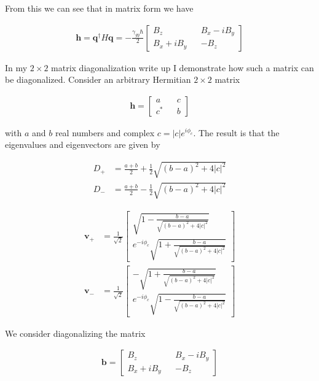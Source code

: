 \documentclass[12pt]{article}
\newcommand{\bv}[1]{\boldsymbol{#1}}
\begin{document}
From this we can see that in matrix form we have

\begin{align}
\bv{h} = \bv{q}^{\dag}H\bv{q} = -\frac{\gamma_{gy}\hbar}{2}\begin{bmatrix}
B_z && B_x-iB_y\\
B_x+iB_y && -B_z
\end{bmatrix}
\end{align}

In my $2\times2$ matrix diagonalization write up I demonstrate how such a matrix can be diagonalized.
Consider an arbitrary Hermitian $2\times 2$ matrix

\begin{align}
\bv{h} = \begin{bmatrix}
a && c\\
c^* && b
\end{bmatrix}
\end{align}

with $a$ and $b$ real numbers and complex $c = |c|e^{i\phi_c}$.
The result is that the eigenvalues and eigenvectors are given by

\begin{align}
D_+ &= \frac{a+b}{2} + \frac{1}{2}\sqrt{(b-a)^2 + 4|c|^2} \nonumber\\
D_- &= \frac{a+b}{2} - \frac{1}{2}\sqrt{(b-a)^2 + 4|c|^2}
\end{align}

\begin{align}
\bv{v}_+ &= 
\frac{1}{\sqrt{2}}\begin{bmatrix}
\sqrt{1-\frac{b-a}{\sqrt{(b-a)^2+4|c|^2}}}\\e^{-i\phi_c}\sqrt{1+\frac{b-a}{\sqrt{(b-a)^2+4|c|^2}}}
\end{bmatrix} \nonumber\\
\bv{v}_- &= 
\frac{1}{\sqrt{2}}\begin{bmatrix}
-\sqrt{1+\frac{b-a}{\sqrt{(b-a)^2+4|c|^2}}}\\e^{-i\phi_c}\sqrt{1-\frac{b-a}{\sqrt{(b-a)^2+4|c|^2}}}
\end{bmatrix}
\end{align}

We consider diagonalizing the matrix 

\begin{align}
\bv{b} = \begin{bmatrix}
B_z && B_x-iB_y\\
B_x+iB_y && -B_z
\end{bmatrix}
\end{align}
\end{document}
